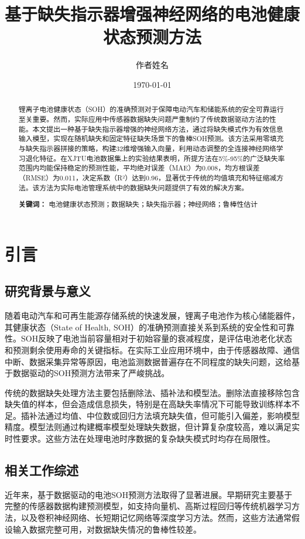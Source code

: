 \documentclass{ctexart}
\title{基于缺失指示器增强神经网络的电池健康状态预测方法}
\author{作者姓名}
\date{\today}
\begin{document}
\maketitle

\begin{abstract}
锂离子电池健康状态（SOH）的准确预测对于保障电动汽车和储能系统的安全可靠运行至关重要。然而，实际应用中传感器数据缺失问题严重制约了传统数据驱动方法的性能。本文提出一种基于缺失指示器增强的神经网络方法，通过将缺失模式作为有效信息输入模型，实现在随机缺失和固定特征缺失场景下的鲁棒SOH预测。该方法采用零填充与缺失指示器拼接的策略，构建32维增强输入向量，利用动态调整的全连接神经网络学习退化特征。在XJTU电池数据集上的实验结果表明，所提方法在5\%-95\%的广泛缺失率范围内均能保持稳定的预测性能，平均绝对误差（MAE）为0.008，均方根误差（RMSE）为0.011，决定系数（R²）达到0.96，显著优于传统的均值填充和特征缩减方法。该方法为实际电池管理系统中的数据缺失问题提供了有效的解决方案。

\textbf{关键词：} 电池健康状态预测；数据缺失；缺失指示器；神经网络；鲁棒性估计
\end{abstract}

\section{引言}

\subsection{研究背景与意义}
随着电动汽车和可再生能源存储系统的快速发展，锂离子电池作为核心储能器件，其健康状态（State of Health, SOH）的准确预测直接关系到系统的安全性和可靠性。SOH反映了电池当前容量相对于初始容量的衰减程度，是评估电池老化状态和预测剩余使用寿命的关键指标。在实际工业应用环境中，由于传感器故障、通信中断、数据采集异常等原因，电池监测数据普遍存在不同程度的缺失问题，这给基于数据驱动的SOH预测方法带来了严峻挑战。

传统的数据缺失处理方法主要包括删除法、插补法和模型法。删除法直接移除包含缺失值的样本，但会造成信息损失，特别是在高缺失率情况下可能导致训练样本不足。插补法通过均值、中位数或回归方法填充缺失值，但可能引入偏差，影响模型精度。模型法则通过构建概率模型处理缺失数据，但计算复杂度较高，难以满足实时性要求。这些方法在处理电池时序数据的复杂缺失模式时均存在局限性。

\subsection{相关工作综述}
近年来，基于数据驱动的电池SOH预测方法取得了显著进展。早期研究主要基于完整的传感器数据构建预测模型，如支持向量机\cite{nuhic2013health}、高斯过程回归\cite{richardson2017gaussian}等传统机器学习方法，以及卷积神经网络\cite{luo2022review}、长短期记忆网络\cite{xia2023state}等深度学习方法。然而，这些方法通常假设输入数据完整可用，对数据缺失情况的鲁棒性较差。
\end{document}
